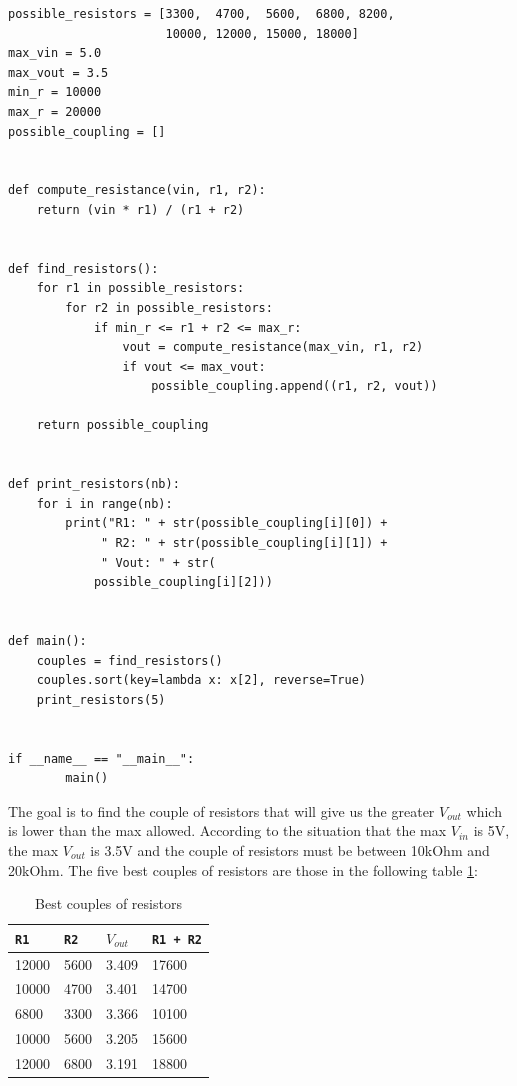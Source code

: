 \begin{code}
  \label{code:implementation:sec:devices:subsec:1-5V:electrical-scheme:formula}
  \begin{verbatim}
possible_resistors = [3300,  4700,  5600,  6800, 8200,
                      10000, 12000, 15000, 18000]
max_vin = 5.0
max_vout = 3.5
min_r = 10000
max_r = 20000
possible_coupling = []


def compute_resistance(vin, r1, r2):
    return (vin * r1) / (r1 + r2)


def find_resistors():
    for r1 in possible_resistors:
        for r2 in possible_resistors:
            if min_r <= r1 + r2 <= max_r:
                vout = compute_resistance(max_vin, r1, r2)
                if vout <= max_vout:
                    possible_coupling.append((r1, r2, vout))

    return possible_coupling


def print_resistors(nb):
    for i in range(nb):
        print("R1: " + str(possible_coupling[i][0]) +
             " R2: " + str(possible_coupling[i][1]) +
             " Vout: " + str(
            possible_coupling[i][2]))


def main():
    couples = find_resistors()
    couples.sort(key=lambda x: x[2], reverse=True)
    print_resistors(5)


if __name__ == "__main__":
        main()
  \end{verbatim}
\end{code}

The goal is to find the couple of resistors that will give us the greater $V_{out}$ which is lower than the max allowed.
According to the situation that the max $V_{in}$ is 5V, the max $V_{out}$ is 3.5V and the couple of resistors must be between 10kOhm and 20kOhm.
The five best couples of resistors are those in the following table \ref{table:implementation:sec:devices:subsec:1-5V:electrical-scheme:formula}:

\begin{table}[H]
  \centering
  \begin{tabular}{|l|l|l|l|}
    \hline
    \texttt{R1} & \texttt{R2} &\texttt{$V_{out}$} & \texttt{R1 + R2} \\ \hline
    12000 & 5600 & 3.409 & 17600   \\ \hline
    10000 & 4700 & 3.401 & 14700   \\ \hline
    6800  & 3300 & 3.366 & 10100   \\ \hline
    10000 & 5600 & 3.205 & 15600   \\ \hline
    12000 & 6800 & 3.191 & 18800   \\ \hline
  \end{tabular}
  \caption{Best couples of resistors}
  \label{table:implementation:sec:devices:subsec:1-5V:electrical-scheme:formula}
\end{table}



